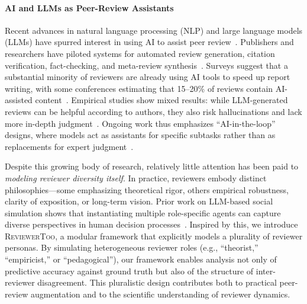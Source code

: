 \documentclass{article} %
\newcommand{\shrink}[1][0.5]{\vspace{-#1\baselineskip}}
\begin{document}
\paragraph{AI and LLMs as Peer-Review Assistants} \shrink[0.75]
Recent advances in natural language processing (NLP) and large language models (LLMs) have spurred interest in using AI to assist peer review~\citep{liang2024can,tyser2024ai}. Publishers and researchers have piloted systems for automated review generation, citation verification, fact-checking, and meta-review synthesis~\citep{hossain2024llms}. Surveys suggest that a substantial minority of reviewers are already using AI tools to speed up report writing, with some conferences estimating that 15--20\% of reviews contain AI-assisted content~\citep{latona2024ai,naddaf2025ai}. Empirical studies show mixed results: while LLM-generated reviews can be helpful according to authors, they also risk hallucinations and lack more in-depth judgment~\citep{doi:10.1056/AIoa2400196}. Ongoing work thus emphasizes ``AI-in-the-loop'' designs, where models act as assistants for specific subtasks rather than as replacements for expert judgment~\citep{idahl2024openreviewer,liang2024monitoring}.

Despite this growing body of research, relatively little attention has been paid to \emph{modeling reviewer diversity itself}. In practice, reviewers embody distinct philosophies---some emphasizing theoretical rigor, others empirical robustness, clarity of exposition, or long-term vision. Prior work on LLM-based social simulation shows that instantiating multiple role-specific agents can capture diverse perspectives in human decision processes~\citep{sahakyan2025disparities,anthis2025llm}. Inspired by this, we introduce \textsc{ReviewerToo}, a modular framework that explicitly models a plurality of reviewer personas. By simulating heterogeneous reviewer roles (e.g., ``theorist,'' ``empiricist,'' or ``pedagogical''), our framework enables analysis not only of predictive accuracy against ground truth but also of the structure of inter-reviewer disagreement. This pluralistic design contributes both to practical peer-review augmentation and to the scientific understanding of reviewer dynamics.
\end{document}
